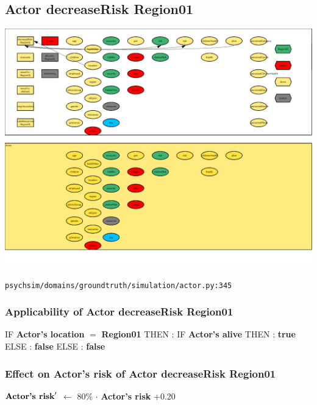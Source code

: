 \documentclass{article}%
\begin{document}
%
\subsection{Actor decreaseRisk Region01}%
\label{subsec:Actor decreaseRisk Region01}%
\includegraphics[width=\textwidth]{images/Actor-decreaseRisk-Region01.png}%
\begin{flushleft}%
\verb|psychsim/domains/groundtruth/simulation/actor.py:345|%
\end{flushleft}%
\subsubsection{Applicability of Actor decreaseRisk Region01}%
\label{ssubsec:Applicability of Actor decreaseRisk Region01}%
\begin{flushleft}%
IF %
\textbf{Actor's location}%
$=$%
\textbf{Region01}%
\linebreak%
\hspace*{2em}%
THEN %
: %
IF %
\textbf{Actor's alive}%
\linebreak%
\hspace*{4em}%
THEN %
: %
\textbf{true}%
\linebreak%
\hspace*{4em}%
ELSE %
: %
\textbf{false}%
\linebreak%
\hspace*{2em}%
ELSE %
: %
\textbf{false}%
\end{flushleft}

%
\subsubsection{Effect on Actor's risk of Actor decreaseRisk Region01}%
\label{ssubsec:Effect on Actor's risk of Actor decreaseRisk Region01}%
\begin{flushleft}%
$\mbox{\textbf{Actor's risk}} '$%
$\leftarrow$%
80\%%
$\cdot$%
\textbf{Actor's risk}%
+0.20%
\end{flushleft}
\end{document}
